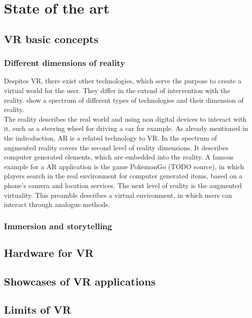 \chapter{State of the art}
\section{VR basic concepts}

\subsection{Different dimensions of reality}
Despites VR, there exist other technologies, which serve the purpose to create a virtual world for the user. They differ in the extend of intervention with the reality. \cite{Tham.2018} show a spectrum of different types of technologies and their dimension of reality.\\
The reality describes the real world and using non digital devices to interact with it, such as a steering wheel for driving a car for example. As already mentioned in the indroduction, AR is a related technology to VR. In the spectrum of \cite{Tham.2018} augmented reality covers the second level of reality dimensions. It describes computer generated elements, which are embedded into the reality. A famous example for a AR application is the game PokemonGo (TODO source), in which players search in the real environment for computer generated items, based on a phone's camera and location services. The next level of reality is the augmented virtuality. This preamble describes a virtual environment, in which users can interact through analogue methods.
\subsection{Immersion and storytelling}
\section{Hardware for VR}
\section{Showcases of VR applications}

\section{Limits of VR}
